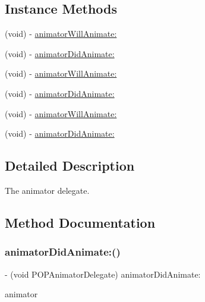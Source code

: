 \subsection*{Instance Methods}
\begin{DoxyCompactItemize}
\item 
(void) -\/ \mbox{\hyperlink{protocol_p_o_p_animator_delegate_01-p_ad5c5b2347027a3edc24a6b1e061c4d13}{animator\+Will\+Animate\+:}}
\item 
(void) -\/ \mbox{\hyperlink{protocol_p_o_p_animator_delegate_01-p_aa2682a4c140550cb2b932ae1e44e84ec}{animator\+Did\+Animate\+:}}
\item 
(void) -\/ \mbox{\hyperlink{protocol_p_o_p_animator_delegate_01-p_ad5c5b2347027a3edc24a6b1e061c4d13}{animator\+Will\+Animate\+:}}
\item 
(void) -\/ \mbox{\hyperlink{protocol_p_o_p_animator_delegate_01-p_aa2682a4c140550cb2b932ae1e44e84ec}{animator\+Did\+Animate\+:}}
\item 
(void) -\/ \mbox{\hyperlink{protocol_p_o_p_animator_delegate_01-p_ad5c5b2347027a3edc24a6b1e061c4d13}{animator\+Will\+Animate\+:}}
\item 
(void) -\/ \mbox{\hyperlink{protocol_p_o_p_animator_delegate_01-p_aa2682a4c140550cb2b932ae1e44e84ec}{animator\+Did\+Animate\+:}}
\end{DoxyCompactItemize}


\subsection{Detailed Description}
The animator delegate. 

\subsection{Method Documentation}
\mbox{\label{protocol_p_o_p_animator_delegate_01-p_aa2682a4c140550cb2b932ae1e44e84ec}} 
\subsubsection{\texorpdfstring{animator\+Did\+Animate\+:()}{animatorDidAnimate:()}\hspace{0.1cm}{\footnotesize\ttfamily [1/3]}}
{\footnotesize\ttfamily -\/ (void P\+O\+P\+Animator\+Delegate) animator\+Did\+Animate\+: \begin{DoxyParamCaption}\item[{(\mbox{\hyperlink{interface_p_o_p_animator}{P\+O\+P\+Animator}} $\ast$)}]{animator }\end{DoxyParamCaption}}


